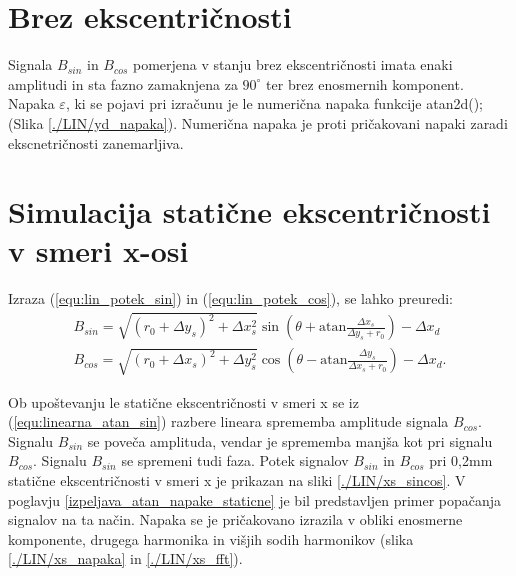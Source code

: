 \section{Brez ekscentričnosti}
Signala $B_{sin}$ in $B_{cos}$ pomerjena v stanju brez ekscentričnosti imata enaki amplitudi in sta fazno zamaknjena za $90^{\circ}$ ter brez enosmernih komponent. Napaka $\varepsilon$, ki se pojavi pri izračunu je le numerična napaka funkcije atan2d(); (Slika \ref{./LIN/yd_napaka}). Numerična napaka je proti pričakovani napaki zaradi ekscnetričnosti zanemarljiva.
\newpage
\section{Simulacija statične ekscentričnosti v smeri x-osi}
Izraza (\ref{equ:lin_potek_sin}) in (\ref{equ:lin_potek_cos}), se lahko preuredi:
\begin{eqnarray}
\label{equ:linearna_atan_sin}
B_{sin}= \sqrt{(r_0+\Delta y_s)^2+\Delta x_s^2} \sin(\theta+  \mathrm{ atan} \frac{\Delta x_s}{\Delta y_s +r_0})-\Delta x_d\\
\label{equ:linearna_atan_cos}
B_{cos}= \sqrt{(r_0+\Delta x_s)^2+\Delta y_s^2} \cos(\theta-  \mathrm{ atan} \frac{\Delta y_s}{\Delta x_s +r_0}) -\Delta x_d.
\end{eqnarray}

Ob upoštevanju le statične ekscentričnosti v smeri x se iz (\ref{equ:linearna_atan_sin}) razbere lineara sprememba amplitude signala $B_{cos}$.
Signalu $B_{sin}$ se poveča amplituda, vendar je sprememba manjša kot pri signalu $B_{cos}$. Signalu $B_{sin}$ se spremeni tudi faza.
Potek signalov $B_{sin}$ in $B_{cos}$ pri 0,2mm statične ekscentričnosti v smeri x je prikazan na sliki \ref{./LIN/xs_sincos}.
V poglavju \ref{izpeljava_atan_napake_staticne} je bil predstavljen primer popačanja signalov na ta način.
Napaka se je pričakovano izrazila v obliki enosmerne komponente, drugega harmonika in višjih sodih harmonikov (slika \ref{./LIN/xs_napaka} in \ref{./LIN/xs_fft}).
